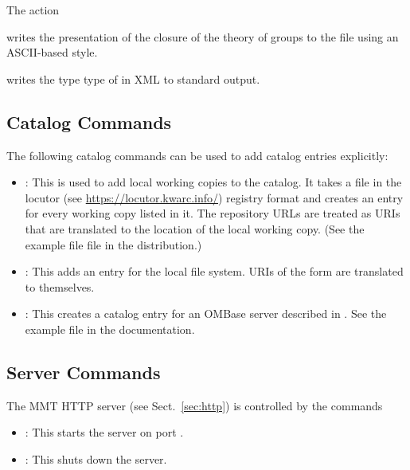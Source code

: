 \begin{example}
The action

\noindent
{}
writes the presentation of the closure of the theory of groups to the file  using an ASCII-based style.

\noindent
{}
writes the type type of  in XML to standard output.
\end{example}

\subsection{Catalog Commands}\label{sec:shell:catalog}
The following catalog commands can be used to add catalog entries explicitly:

\begin{itemize}
\item {}: This is used to add local working copies to the catalog. It takes a file  in the locutor (see \url{https://locutor.kwarc.info/})  registry format and creates an entry for every working copy listed in it. The repository URLs are treated as URIs that are translated to the location of the local working copy. (See the example file  file in the distribution.)
\item {}: This adds an entry for the local file system. URIs of the form  are translated to themselves.
\item {}: This creates a catalog entry for an OMBase server described in . See the example file  in the documentation.
\end{itemize}

\subsection{Server Commands}\label{sec:shell:server}
The MMT HTTP server (see Sect.~\ref{sec:http}) is controlled by the commands
\begin{itemize}
\item {}: This starts the server on port .
\item {}: This shuts down the server.
\end{itemize}